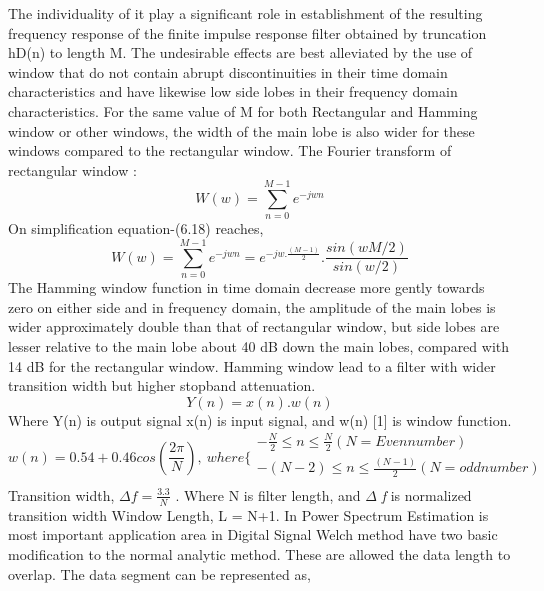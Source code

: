 The individuality of it play a significant role in establishment of the resulting frequency response of the finite impulse response filter obtained by truncation hD(n) to length M. The undesirable effects are best alleviated by the use of window that do not contain abrupt discontinuities in their time domain characteristics and have likewise low side lobes in their frequency domain characteristics. For the same value of M for both Rectangular and Hamming window or other windows, the width of the main lobe is also wider for these windows compared to the rectangular window. The Fourier transform of rectangular window \cite{movlaee2018microwave,goutham2018flexible,arif2018gait,tischler2018system,sloo2018smart,losey2018review,yilmaz2018pv,he2017adaptive,walczak2019artificial,comer2018internet}:
\begin{equation}\tag{6.18}
W ( w ) = \sum _{n=0}^{M-1}e^{-jwn}
\end{equation}
On simplification equation-(6.18) reaches,
\begin{equation}\tag{6.19}
W ( w ) = \sum _{n=0}^{M-1}e^{-jwn}=e^{-jw.\frac{ ( M-1 ) }{2}}.\frac{sin ( wM/2 ) }{sin ( w/2 ) }
\end{equation}
The Hamming window function in time domain decrease more gently towards zero on either side and in frequency domain, the amplitude of the main lobes is wider approximately double than that of rectangular window, but side lobes are lesser relative to the main lobe about 40 dB down the main lobes, compared with 14 dB for the rectangular window. Hamming window lead to a filter with wider transition width but higher stopband attenuation.
\begin{equation}\tag{6.20}
Y ( n ) =x ( n ) .w ( n )
\end{equation}
Where Y(n) is output signal x(n) is input signal, and w(n) [1] is window function.
\begin{equation}\tag{6.21}
w ( n ) =0.54+0.46cos ( \frac{2 \pi }{N} ) ,~ where \{ \begin{array}{ll}
	-\frac{N}{2} \leq n \leq \frac{N}{2}  ( N=Even number ) \\
	- ( N-2 )  \leq n \leq \frac{ ( N-1 ) }{2} ( N=odd number ) \\
	\end{array}
\end{equation}
Transition width,  \(  \Delta f=\frac{3.3}{N} \) . Where N is filter length, and $ \Delta $ \textit{f} is normalized transition width Window Length, L = N+1. In Power Spectrum Estimation is most important application area in Digital Signal Welch method have two basic modification to the normal analytic method. These are allowed the data length to overlap. The data segment can be represented as,
